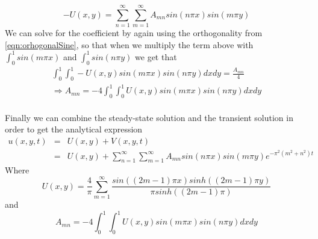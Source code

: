 \documentclass{article}
\begin{document}
\begin{equation}
-U(x,y) =  \sum_{n=1}^{\infty} \sum_{m=1}^{\infty} A_{mn}sin(n\pi x)sin(m\pi y)
\end{equation}
We can solve for the coefficient by again using the orthogonality from \ref{eqn:orhogonalSine}, so that when we multiply the term above with $\int_0^1 sin(m\pi x)$ and $\int_0^1 sin(n\pi y)$ we get that
\begin{subequations}
\begin{eqnarray}
\int_0^1 \int_0^1 -U(x,y) sin(m\pi x)sin(n\pi y) dxdy =  \frac{A_{mn}}{4}\\
\Rightarrow A_{mn} = -4 \int_0^1 \int_0^1 U(x,y) sin(m\pi x)sin(n\pi y) dxdy
\end{eqnarray}
\end{subequations}
\\
Finally we can combine the steady-state solution and the transient solution in order to get the analytical expression
\begin{eqnarray}
u(x,y,t) &=& U(x,y) + V(x,y,t)\\ \nonumber
 &=& U(x,y) + \sum_{n=1}^{\infty} \sum_{m=1}^{\infty} A_{mn}sin(n\pi x)sin(m\pi y)e^{-\pi^2(m^2+n^2)t}
\end{eqnarray}
Where
\begin{equation}
U(x,y) = \frac{4}{\pi} \sum_{m=1}^{\infty} \frac{sin((2m-1)\pi x)sinh((2m-1)\pi y)}{\pi sinh((2m-1)\pi)}
\end{equation}
and 
\begin{equation}
A_{mn} = -4 \int_0^1 \int_0^1 U(x,y) sin(m\pi x)sin(n\pi y) dxdy
\end{equation}
\end{document}
